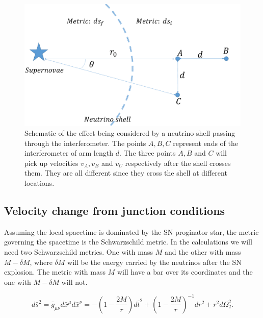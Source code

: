 \documentclass[aps,showpacs,onecolumn,floats,prd,superscriptaddress,nofootinbib]{revtex4-1}
\begin{document}
\begin{figure}[h!]
\begin{center}
\includegraphics[scale = 0.27]{intro.pdf}
\caption{Schematic of the effect being considered by a neutrino shell passing through the interferometer. The points $A,B,C$ represent ends of the interferometer of arm length $d$. The three points $A,B$ and $C$ will pick up velocities $v_A, v_B$ and $v_C$ respectively after the shell crosses them. They are all different since they cross the shell at different locations.}
\label{fig:1}
\end{center}
\end{figure}

\subsection{Velocity change from junction conditions}

Assuming the local spacetime is dominated by the SN proginator star, the metric governing the spacetime is the Schwarzschild metric. In the calculations we will need two Schwarzschild metrics. One with mass $M$ and the other with mass $M - \delta M$, where $\delta M$ will be the energy carried by the neutrinos after the SN explosion. The metric with mass $M$ will have a bar over its coordinates and the one with $M- \delta M$ will not. 
 
\begin{equation}
	d\bar{s}^2 = \bar{g}_{\mu \nu} d\bar{x}^\mu d\bar{x}^\nu = - \left( 1 - \frac{2M}{r} \right) d\bar{t}^2 + \left( 1 - \frac{2M}{r} \right)^{-1} d {r}^2 + r^2 d {\Omega}_2^2. \label{SCH}
\end{equation}
\end{document}
